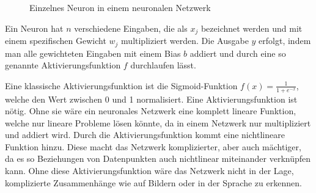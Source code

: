 \documentclass[12pt,a4paper]{report}
\begin{document}
\begin{figure}[!h]
    \centering
{}
    \caption{Einzelnes Neuron in einem neuronalen Netzwerk}
    \label{fig:neuron1}
\end{figure}

Ein Neuron hat $n$ verschiedene Eingaben, die als $x_j$ bezeichnet werden und mit einem spezifischen Gewicht $w_j$ multipliziert werden.
Die Ausgabe $y$ erfolgt, indem man alle gewichteten Eingaben mit einem Bias $b$ addiert und durch eine so genannte
Aktivierungsfunktion $f$ durchlaufen lässt.

Eine klassische Aktivierungsfunktion ist die Sigmoid-Funktion $f(x) = \frac{1}{1 + e^{-x}}$, welche den Wert zwischen 0 und 1 normalisiert.
Eine Aktivierungsfunktion ist nötig.
Ohne sie wäre ein neuronales Netzwerk eine komplett lineare Funktion,
welche nur lineare Probleme lösen könnte\cite{activations}, da in einem Netzwerk nur multipliziert und addiert wird.
Durch die Aktivierungsfunktion kommt eine nichtlineare Funktion hinzu.
Diese macht das Netzwerk komplizierter,
aber auch mächtiger, da es so Beziehungen von Datenpunkten auch nichtlinear miteinander verknüpfen kann.
Ohne diese Aktivierungsfunktion wäre das Netzwerk nicht in der Lage, komplizierte Zusammenhänge wie auf Bildern oder in der Sprache zu erkennen\cite{activations}.
\end{document}
